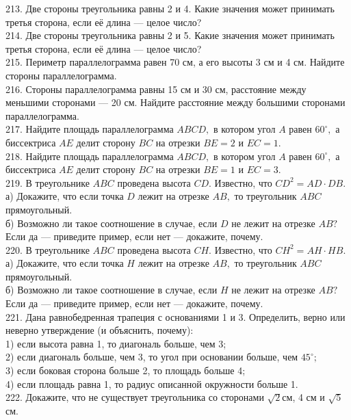\documentclass[12pt]{article}
\begin{document}
213. Две стороны треугольника равны 2 и 4. Какие значения может принимать третья сторона, если её длина --- целое число?\\
214. Две стороны треугольника равны 2 и 5. Какие значения может принимать третья сторона, если её длина --- целое число?\\
215. Периметр параллелограмма равен 70 см, а его высоты 3 см и 4 см. Найдите стороны параллелограмма.\\
216. Стороны параллелограмма равны 15 см и 30 см, расстояние между меньшими сторонами --- 20 см. Найдите расстояние между большими сторонами параллелограмма.\\
217. Найдите площадь параллелограмма $ABCD,$ в котором угол $A$ равен $60^\circ,$ а биссектриса $AE$ делит сторону $BC$ на отрезки $BE=2$ и $EC=1.$\\
218. Найдите площадь параллелограмма $ABCD,$ в котором угол $A$ равен $60^\circ,$ а биссектриса $AE$ делит сторону $BC$ на отрезки $BE=1$ и $EC=3.$\\
219. В треугольнике $ABC$ проведена высота $CD.$ Известно, что $CD^2=AD\cdot DB.$\\
а) Докажите, что если точка $D$ лежит на отрезке $AB,$ то треугольник $ABC$ прямоугольный.\\
б) Возможно ли такое соотношение в случае, если $D$ не лежит на отрезке $AB?$ Если да --- приведите пример, если нет --- докажите, почему.\\
220. В треугольнике $ABC$ проведена высота $CH.$ Известно, что $CH^2=AH\cdot HB.$\\
а) Докажите, что если точка $H$ лежит на отрезке $AB,$ то треугольник $ABC$ прямоугольный.\\
б) Возможно ли такое соотношение в случае, если $H$ не лежит на отрезке $AB?$ Если да --- приведите пример, если нет --- докажите, почему.\\
221. Дана равнобедренная трапеция с основаниями 1 и 3. Определить, верно или неверно утверждение (и объяснить, почему):\\
1) если высота равна 1, то диагональ больше, чем 3;\\
2) если диагональ больше, чем 3, то угол при основании больше, чем $45^\circ;$\\
3) если боковая сторона больше 2, то площадь больше 4;\\
4) если площадь равна 1, то радиус описанной окружности больше 1.\\
222. Докажите, что не существует треугольника со сторонами $\sqrt{2}$см, 4 см и $\sqrt{5}$ см.\\
\end{document}
